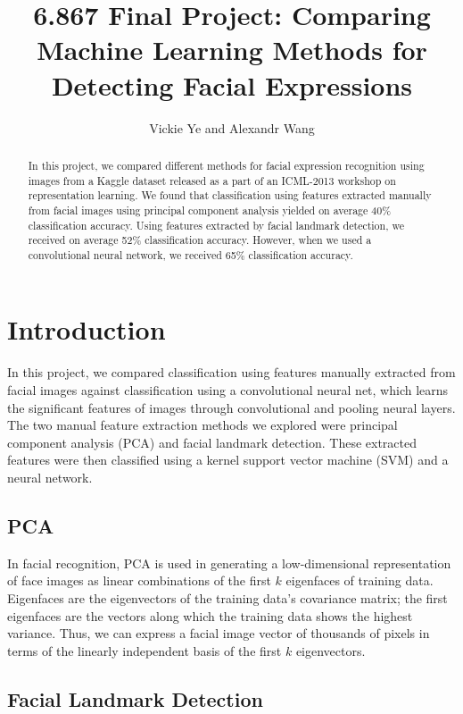 \documentclass[10pt, twocolumn, twoside]{article}
\title{6.867 Final Project: Comparing Machine Learning Methods for Detecting Facial Expressions} %
\date{}
\author {Vickie Ye and Alexandr Wang}
\begin{document}
\maketitle


\begin{abstract}
In this project, we compared different methods for facial expression recognition
using images from a Kaggle dataset released as a part of an ICML-2013 workshop
on representation learning.
We found that classification using features extracted manually from facial images
using principal component analysis yielded on average 40\% classification accuracy.
Using features extracted by facial landmark detection, we received on average 52\%
classification accuracy. However, when we used a convolutional neural network, we
received 65\% classification accuracy.
\end{abstract}

\section{Introduction}

In this project, we compared classification using features manually extracted from
facial images against classification using a convolutional neural net, which learns
the significant features of images through convolutional and pooling neural layers.
The two manual feature extraction methods we explored were principal component
analysis (PCA) and facial landmark detection. These extracted features were then
classified using a kernel support vector machine (SVM) and a neural network.

\subsection{PCA}

In facial recognition, PCA is used in generating a low-dimensional representation of
face images as linear combinations of the first $k$ eigenfaces of training data.
Eigenfaces are the eigenvectors of the training data's covariance matrix; the first
eigenfaces are the vectors along which the training data shows the highest variance.
Thus, we can express a facial image vector of thousands of pixels in terms of
the linearly independent basis of the first $k$ eigenvectors. 

\subsection{Facial Landmark Detection}
\end{document}
